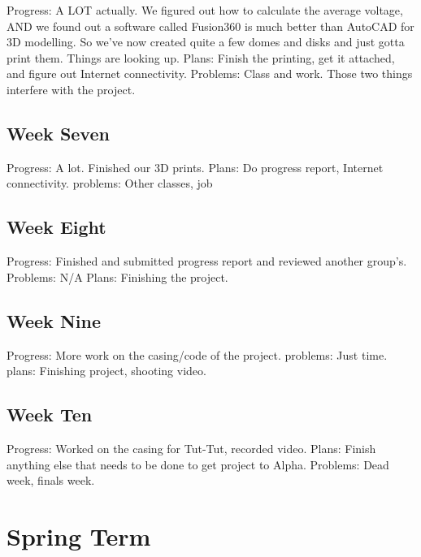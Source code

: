 \documentclass[letterpaper,10pt,draftclsnofoot,onecolumn]{article}
\begin{document}
Progress: A LOT actually. We figured out how to calculate the average voltage, AND we found out a software called Fusion360 is much better than AutoCAD for 3D modelling. So we've now created quite a few domes and disks and just gotta print them. Things are looking up.
Plans: Finish the printing, get it attached, and figure out Internet connectivity.
Problems: Class and work. Those two things interfere with the project.

\subsection{Week Seven}

Progress: A lot. Finished our 3D prints.
\newline
Plans: Do progress report, Internet connectivity.
\newline
problems: Other classes, job

\subsection{Week Eight}

Progress: Finished and submitted progress report and reviewed another group's.
\newline
Problems: N/A
\newline
Plans: Finishing the project.

\subsection{Week Nine}

Progress: More work on the casing/code of the project.
\newline
problems: Just time.
 \newline
plans: Finishing project, shooting video.

\subsection{Week Ten}

Progress: Worked on the casing for Tut-Tut, recorded video.
\newline
Plans: Finish anything else that needs to be done to get project to Alpha.
\newline
Problems: Dead week, finals week.

\section{Spring Term}
\end{document}
